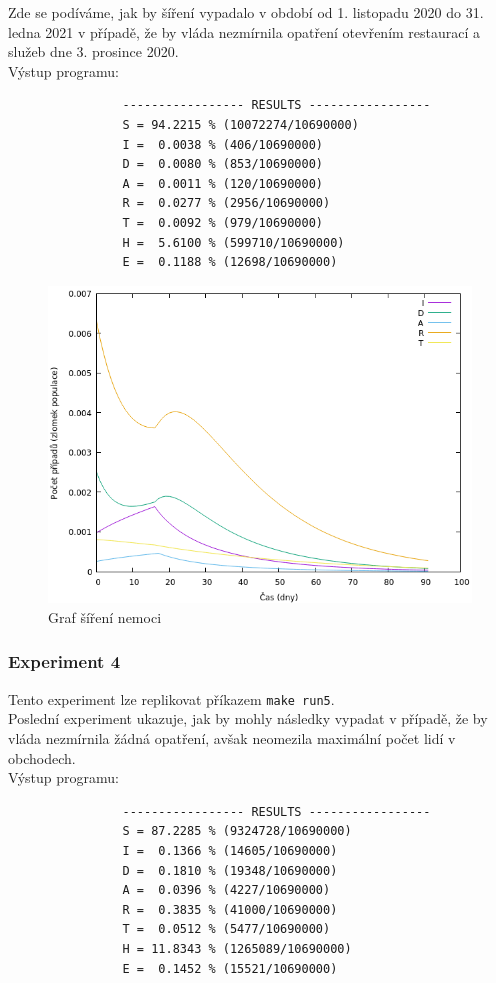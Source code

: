 \documentclass[a4paper,11pt]{article}
\begin{document}
			Zde se podíváme, jak by šíření vypadalo v období od 1. listopadu 2020 do 31. ledna 2021 v případě, že by vláda nezmírnila opatření otevřením restaurací a služeb dne 3. prosince 2020.\\
			
			\noindent Výstup programu:
			\begin{verbatim}
				----------------- RESULTS -----------------
				S = 94.2215 % (10072274/10690000)
				I =  0.0038 % (406/10690000)
				D =  0.0080 % (853/10690000)
				A =  0.0011 % (120/10690000)
				R =  0.0277 % (2956/10690000)
				T =  0.0092 % (979/10690000)
				H =  5.6100 % (599710/10690000)
				E =  0.1188 % (12698/10690000)
			\end{verbatim}
		
			\begin{figure}[H]
				\caption{Graf šíření nemoci}
				\label{fig6}
				\centering
				\includegraphics[scale=0.6]{exp_cz3.png}
			\end{figure}
		
		\subsubsection{Experiment 4}
			Tento experiment lze replikovat příkazem \texttt{make run5}.\\
		
			Poslední experiment ukazuje, jak by mohly následky vypadat v případě, že by vláda nezmírnila žádná opatření, avšak neomezila maximální počet lidí v obchodech.\\
		
			\noindent Výstup programu:
			\begin{verbatim}
				----------------- RESULTS -----------------
				S = 87.2285 % (9324728/10690000)
				I =  0.1366 % (14605/10690000)
				D =  0.1810 % (19348/10690000)
				A =  0.0396 % (4227/10690000)
				R =  0.3835 % (41000/10690000)
				T =  0.0512 % (5477/10690000)
				H = 11.8343 % (1265089/10690000)
				E =  0.1452 % (15521/10690000)
			\end{verbatim}
		
\end{document}
